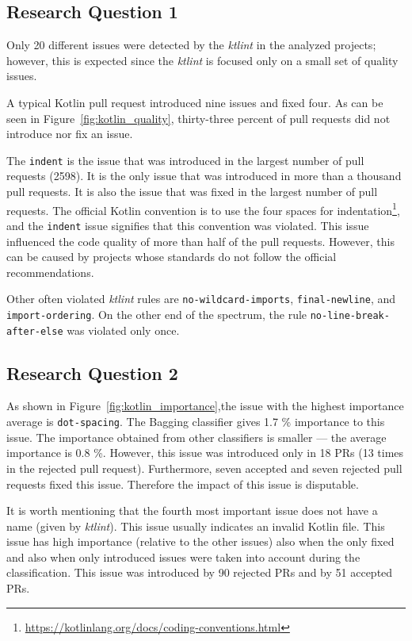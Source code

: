 \documentclass[digital,oneside,oldtable,nolof,nolot,nocover]{fithesis4}
\begin{document}
\subsection{Research Question 1}
\label{sec:orgb40f735}
Only 20 different issues were detected by the \emph{ktlint} in the analyzed projects;
however, this is expected since the \emph{ktlint} is focused only on a small set of quality issues.

A typical Kotlin pull request introduced nine issues and fixed four.
As can be seen in Figure~\ref{fig:kotlin_quality}, thirty-three percent
of pull requests did not introduce nor fix an issue.

The \texttt{indent} is the issue that was introduced in the largest number of pull requests (2598). It is the
only issue that was introduced in more than a thousand pull requests. It is also the issue
that was fixed in the largest number of pull requests. The official Kotlin convention is
to use the four spaces for indentation\footnote{\url{https://kotlinlang.org/docs/coding-conventions.html}},
and the \texttt{indent} issue signifies that this convention was violated. This issue influenced
the code quality of more than half of the pull requests. However, this can be caused by projects
whose standards do not follow the official recommendations.

Other often violated \emph{ktlint} rules are \texttt{no-wildcard-imports}, \texttt{final-newline}, and \texttt{import-ordering}.
On the other end of the spectrum, the rule \texttt{no-line-break-after-else} was violated only once.
\subsection{Research Question 2}
\label{sec:org69c7a87}
As shown in Figure~\ref{fig:kotlin_importance},the issue with
the highest importance average is \texttt{dot-spacing}.
The Bagging classifier gives 1.7 \% importance to this issue. The importance obtained from other
classifiers is smaller --- the average importance is 0.8 \%.
However, this issue was introduced only in 18 PRs (13 times in the rejected pull request).
Furthermore, seven accepted and seven rejected pull requests fixed this issue.
Therefore the impact of this issue is disputable.

It is worth mentioning that the fourth most important issue does not have a name
(given by \emph{ktlint}).  This issue usually indicates an invalid Kotlin file.  This
issue has high importance (relative to the other issues) also when the only
fixed and also when only introduced issues were taken into account during the
classification. This issue was introduced by 90 rejected PRs and by 51
accepted PRs.
\end{document}
